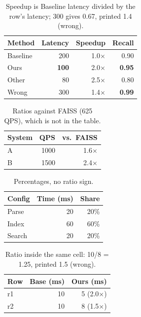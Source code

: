 \documentclass{article}
\begin{document}
\begin{table}[h]\centering
\begin{tabular}{lrrr}
\toprule
Method & Latency & Speedup & Recall \\
\midrule
Baseline & 200 & 1.0$\times$ & 0.90 \\
Ours & \textbf{100} & 2.0$\times$ & \textbf{0.95} \\
Other & 80 & 2.5$\times$ & 0.80 \\
Wrong & 300 & 1.4$\times$ & \bfseries 0.99 \\
\bottomrule
\end{tabular}
\caption{Speedup is Baseline latency divided by the row's latency; 300 gives 0.67, printed 1.4 (wrong).}
\end{table}
\begin{table}[h]\centering
\begin{tabular}{lrr}
\toprule
System & QPS & vs.\ FAISS \\
\midrule
A & 1000 & 1.6$\times$ \\
B & 1500 & 2.4$\times$ \\
\bottomrule
\end{tabular}
\caption{Ratios against FAISS (625 QPS), which is not in the table.}
\end{table}
\begin{table}[h]\centering
\begin{tabular}{lrr}
\toprule
Config & Time (ms) & Share \\
\midrule
Parse & 20 & 20\% \\
Index & 60 & 60\% \\
Search & 20 & 20\% \\
\bottomrule
\end{tabular}
\caption{Percentages, no ratio sign.}
\end{table}
\begin{table}[h]\centering
\begin{tabular}{lrr}
\toprule
Row & Base (ms) & Ours (ms) \\
\midrule
r1 & 10 & 5 (2.0$\times$) \\
r2 & 10 & 8 (1.5$\times$) \\
\bottomrule
\end{tabular}
\caption{Ratio inside the same cell: 10/8 = 1.25, printed 1.5 (wrong).}
\end{table}
\end{document}
